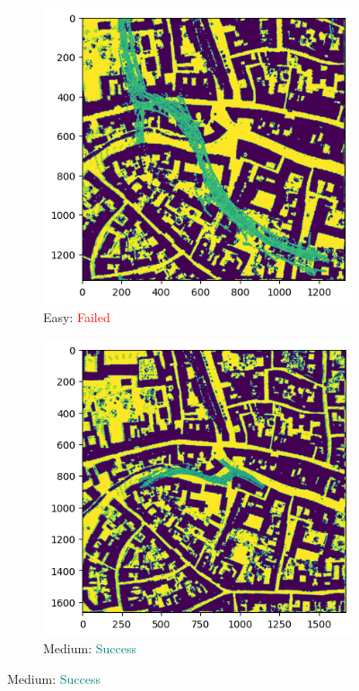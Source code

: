 \documentclass[11pt]{article}
\begin{document}
    \newpage
    \begin{figure}[p]
        \centering
        \begin{subfigure}{0.45\textwidth}
            \centering
            \includegraphics[width=\linewidth]{images/full/easy/4_0_1_easy}
            \caption{Easy: \textcolor{red}{Failed}}
            \label{fig:4_0_1_easy}
        \end{subfigure}
        \hfill
        \begin{subfigure}{0.45\textwidth}
            \centering
            \includegraphics[width=\linewidth]{images/full/medium/4_0_1_medium}
            \caption{Medium: \textcolor{teal}{Success}}
            \label{fig:4_0_1_medium}
        \end{subfigure}


\end{figure}
\end{document}
